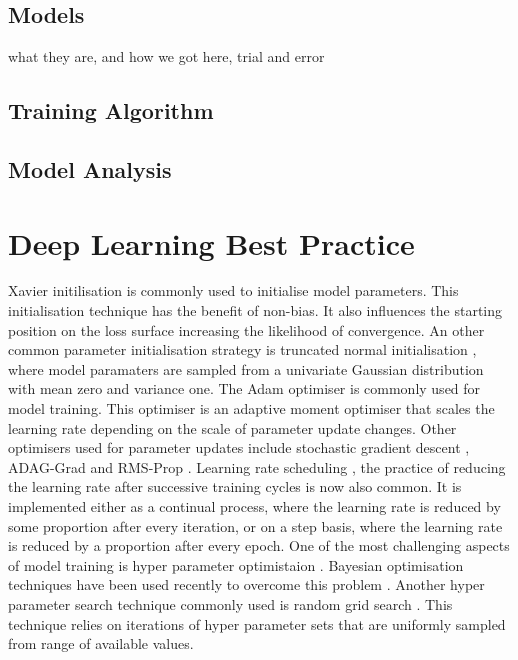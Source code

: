\subsection{Models}
what they are, and how we got here, trial and error

\subsection{Training Algorithm}

\subsection{Model Analysis}



\section{Deep Learning Best Practice}
 Xavier initilisation \cite{reference} is commonly used to initialise model parameters. This initialisation technique has the benefit of non-bias. It also influences the starting position on the loss surface increasing the likelihood of convergence. An other common parameter initialisation strategy is truncated normal initialisation \cite{reference}, where model paramaters are sampled from a univariate Gaussian distribution with mean zero and variance one. \newline
The Adam \cite{reference} optimiser is commonly used for model training. This optimiser is an adaptive moment optimiser that scales the learning rate depending on the scale of parameter update changes. Other optimisers used for parameter updates include stochastic gradient descent \cite{reference}, ADAG-Grad \cite {reference} and RMS-Prop \cite{reference}. \newline
Learning rate scheduling \cite{reference}, the practice of reducing the learning rate after successive training cycles is now also common. It is implemented either as a continual process, where the learning rate is reduced by some proportion after every iteration, or on a step basis, where the learning rate is reduced by a proportion after every epoch. \newline
One of the most challenging aspects of model training is hyper parameter optimistaion \cite{reference}. Bayesian optimisation techniques have been used recently to overcome this problem \cite{reference}. Another hyper parameter search technique commonly used is random grid search \cite{reference}. This technique relies on iterations of hyper parameter sets that are uniformly sampled from range of available values. \newline
